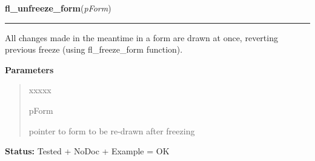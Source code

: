 \hspace{.8\funcindent}\begin{boxedminipage}{\funcwidth}

    \raggedright \textbf{fl\_unfreeze\_form}(\textit{pForm})

    \vspace{-1.5ex}

    \rule{\textwidth}{0.5\fboxrule}
\setlength{\parskip}{2ex}
    All changes made in the meantime in a form are drawn at once, reverting
    previous freeze (using fl\_freeze\_form function).

\setlength{\parskip}{1ex}
      \textbf{Parameters}
      \vspace{-1ex}

      \begin{quote}
        \begin{Ventry}{xxxxx}

          \item[pForm]

          pointer to form to be re-drawn after freezing

        \end{Ventry}

      \end{quote}

\textbf{Status:} Tested + NoDoc + Example = OK



    \end{boxedminipage}

    \label{xformslib:library:fl_deactivate_form}

    \vspace{0.5ex}

